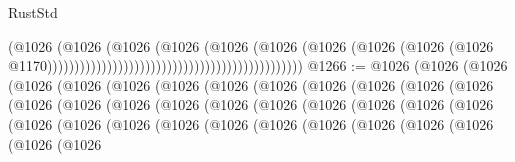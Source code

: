 \begin{lexlean}{RustStd}
\begin{coremodule}
{\begin{coremodule}
{{{{{{{{{{{{{{{{{{{{{{{{{{{{{{{{{{{{{                                                                              (@1026
                                                                                (@1026
                                                                                  (@1026
                                                                                    (@1026
                                                                                      (@1026
                                                                                        (@1026
                                                                                          (@1026
                                                                                            (@1026
                                                                                              (@1026
                                                                                                (@1026
                                                                                                  @1170)))))))))))))))))))))))))))))))))))))))))))))))
@1266 := @1026
    (@1026
      (@1026
        (@1026
          (@1026
            (@1026
              (@1026
                (@1026
                  (@1026
                    (@1026
                      (@1026
                        (@1026
                          (@1026
                            (@1026
                              (@1026
                                (@1026
                                  (@1026
                                    (@1026
                                      (@1026
                                        (@1026
                                          (@1026
                                            (@1026
                                              (@1026
                                                (@1026
                                                  (@1026
                                                    (@1026
                                                      (@1026
                                                        (@1026
                                                          (@1026
                                                            (@1026
                                                              (@1026
                                                                (@1026
                                                                  (@1026
                                                                    (@1026
                                                                      (@1026
}}}}}}}}}}}}}}}}}}}}}}}}}}}}}}}}}}}}}
\end{coremodule}}
\end{coremodule}
\end{lexlean}
